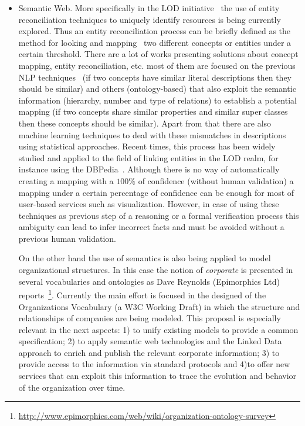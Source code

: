 \documentclass{llncs}
\begin{document}
\begin{itemize}
 \item Semantic Web. More specifically in the LOD initiative~\cite{Berners-Lee-2006} the use of entity reconciliation techniques to uniquely identify resources 
 is being currently explored. Thus an entity reconciliation process can be briefly defined as the method for looking and mapping~\cite{DBLP:conf/semweb/IseleJB10,DBLP:conf/icwe/IseleJB12} two different 
 concepts or entities under a certain threshold. There are a lot of  works presenting solutions about concept mapping, entity reconciliation, etc. 
 most of them are focused on the previous NLP techniques~\cite{conf/www/MaaliCP11,Serimi} (if two concepts have similar literal descriptions then they should be similar) 
 and others (ontology-based) that also exploit the semantic information (hierarchy, number and type of relations) to establish a potential mapping 
 (if two concepts share similar properties and similar super classes then these concepts should be similar). Apart from that 
 there are also machine learning techniques to deal with these mismatches in descriptions using statistical approaches. Recent times, 
 this process has been widely studied and applied to the field of linking entities in the LOD realm, for instance using the DBPedia~\cite{Mendes:2011:DSS:2063518.2063519}. 
 Although there is no way of automatically creating a mapping with a $100\%$ of confidence (without human validation) a mapping under a certain percentage of confidence can be 
 enough for most of user-based services such as visualization. However, in case of using these techniques as previous step of a reasoning or 
 a formal verification process this ambiguity can lead to infer incorrect facts and must be avoided without a previous human validation. 

 On the other hand the use of semantics is also being applied to model organizational structures. In this case the notion 
 of \textit{corporate} is presented in several vocabularies and ontologies as Dave Reynolds (Epimorphics Ltd) 
 reports~\footnote{\url{http://www.epimorphics.com/web/wiki/organization-ontology-survey}}. 
 Currently the main effort is focused in the designed of the Organizations Vocabulary (a W3C Working Draft) in which the structure and 
 relationships of companies are being modeled. This proposal is especially relevant in the next aspects:  
 1) to unify existing models to provide a common specification; 2) to apply semantic web technologies and the Linked Data approach to enrich 
 and publish the relevant corporate information; 3) to provide access to the information via standard protocols 
 and 4)to  offer new services that can exploit this information to trace the evolution and behavior of the organization over time.


\end{itemize}
\end{document}
